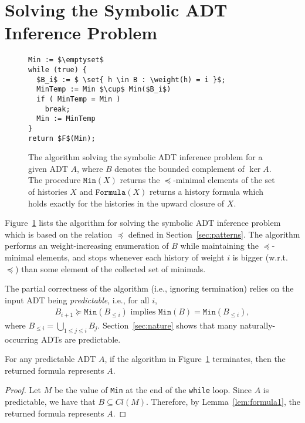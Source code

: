 \section{Solving the Symbolic ADT Inference Problem}

\begin{figure}
\begin{lstlisting}
Min := $\emptyset$
while (true) {
  $B_i$ := $ \set{ h \in B : \weight(h) = i }$;
  MinTemp := Min $\cup$ Min($B_i$)
  if ( MinTemp = Min )
    break;
  Min := MinTemp
}
return $F$(Min);
\end{lstlisting}
\caption{The algorithm solving the symbolic ADT inference problem for a given ADT $A$, where $B$ denotes the bounded complement of $\ker A$. The procedure $\texttt{Min}(X)$ returns the $\preceq$-minimal elements of the set of histories $X$ and $\texttt{Formula}(X)$ returns a history formula which holds exactly for the histories in the upward closure of $X$.} 
\label{fig:algorithm}
\end{figure}

Figure~\ref{fig:algorithm} lists the algorithm for solving the symbolic ADT inference problem which is based on the relation $\preceq$ 
defined in Section~\ref{sec:patterns}.
The algorithm performs an weight-increasing enumeration of $B$ while maintaining the
$\preceq$-minimal elements, and stops whenever each history of weight $i$ is bigger (w.r.t. $\preceq$) than some
element of the collected set of minimals.

The partial correctness of the algorithm (i.e., ignoring termination) relies on the input ADT being \emph{predictable}, i.e.,
for all $i$,
\begin{align*}
B_{i+1} \succeq \texttt{Min}(B_{\leq i}) \mbox{ implies } \texttt{Min}(B) = \texttt{Min}(B_{\leq i}),
\end{align*}
where $B_{\leq i}=\bigcup_{1\leq j\leq i}B_j$.
Section~\ref{sec:nature} shows that many naturally-occurring ADTs are predictable.

\begin{theorem}\label{th:corr1}
For any predictable ADT $A$, if the algorithm in Figure~\ref{fig:algorithm} terminates, then the returned formula represents $A$.
\end{theorem}
\begin{proof}
Let $M$ be the value of \texttt{Min} at the end of the \texttt{while} loop.
Since $A$ is predictable, we have that $B \subseteq Cl(M)$. %
Therefore, by Lemma~\ref{lem:formula1}, the returned formula represents $A$.
\end{proof}

